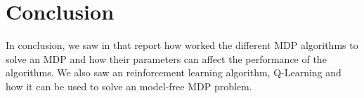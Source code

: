 \documentclass[10pt, twocolumn]{article}
\begin{document}
	\section{Conclusion}
		In conclusion, we saw in that report how worked the different MDP algorithms to solve an MDP and how their parameters can affect the performance of the algorithms. We also saw an reinforcement learning algorithm, Q-Learning and how it can be used to solve an model-free MDP problem.
\end{document}

